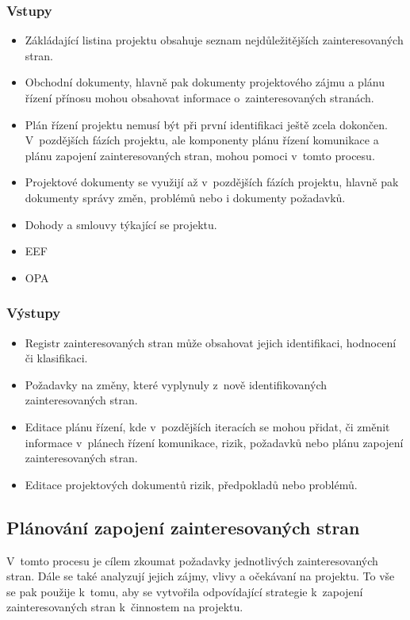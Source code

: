 \subsubsection*{Vstupy}
\begin{itemize}
    \item Zákládající listina projektu obsahuje seznam nejdůležitějších zainteresovaných stran. 
    \item Obchodní dokumenty, hlavně pak dokumenty projektového zájmu a plánu řízení přínosu mohou obsahovat informace o~zainteresovaných stranách. 
    \item Plán řízení projektu nemusí být při první identifikaci ještě zcela dokončen. V~pozdějších fázích projektu, ale komponenty plánu řízení komunikace a plánu zapojení zainteresovaných stran, mohou pomoci v~tomto procesu.
    \item Projektové dokumenty se využijí až v~pozdějších fázích projektu, hlavně pak dokumenty správy změn, problémů nebo i dokumenty požadavků.
    \item Dohody a smlouvy týkající se projektu.
    \item EEF
    \item OPA
\end{itemize}
\subsubsection*{Výstupy}
\begin{itemize}
    \item Registr zainteresovaných stran může obsahovat jejich identifikaci, hodnocení či klasifikaci.
    \item Požadavky na změny, které vyplynuly z~nově identifikovaných zainteresovaných stran.
    \item Editace plánu řízení, kde v~pozdějších iteracích se mohou přidat, či změnit informace v~plánech řízení komunikace, rizik, požadavků nebo plánu zapojení zainteresovaných stran.
    \item Editace projektových dokumentů rizik, předpokladů nebo problémů.
\end{itemize}


\subsection*{Plánování zapojení zainteresovaných stran}

V~tomto procesu je cílem zkoumat požadavky jednotlivých zainteresovaných stran. Dále se také analyzují jejich zájmy, vlivy a očekávaní na projektu. To vše se pak použije k~tomu, aby se vytvořila odpovídající strategie k~zapojení zainteresovaných stran k~činnostem na projektu. 

